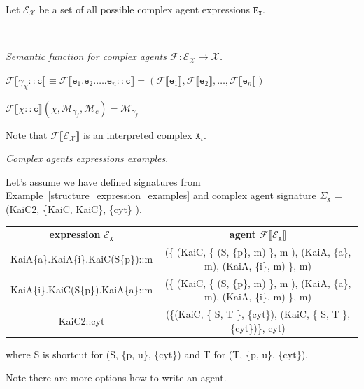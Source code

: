 \documentclass{elsarticle}
\begin{document}
\begin{definition}
Let $\mathcal{E}_\mathcal{X}$ be a set of all possible complex agent expressions $\mathtt{E}_\mathtt{X}$.
\end{definition}

\begin{definition}
~

\textit{Semantic function for complex agents $\mathcal{F}: \mathcal{E}_\mathcal{X} \rightarrow \mathcal{X}$.}

\begin{center}
$\mathcal{F} \llbracket \gamma_\chi::\mathtt{c} \rrbracket \equiv \mathcal{F} \llbracket \mathtt{e}_1.\mathtt{e}_2.\ldots.\mathtt{e}_n::\mathtt{c} \rrbracket  = (\mathcal{F} \llbracket \mathtt{e}_1 \rrbracket, \mathcal{F} \llbracket \mathtt{e}_2 \rrbracket, \ldots, \mathcal{F} \llbracket \mathtt{e}_n \rrbracket )$

$\mathcal{F} \llbracket \chi::\mathtt{c} \rrbracket (\chi, \mathcal{M}_{\gamma_f}, \mathcal{M}_c) = \mathcal{M}_{\gamma_f}$ 
\end{center}

\end{definition}

Note that $\mathcal{F} \llbracket \mathcal{E}_\mathcal{X} \rrbracket$ is an interpreted complex $\mathtt{X}_\iota$.


\begin{example}\label{complex_expression_examples}
\textit{Complex agents expressions examples}. 

Let's assume we have defined signatures from Example~\ref{structure_expression_examples} and complex agent signature $\Sigma_\mathtt{X}$ = (KaiC2, \{KaiC, KaiC\}, \{cyt\} ).

\begin{center}
\begin{tabular}{ c | c }
\textbf{expression} $\mathcal{E}_\mathtt{X}$ & \textbf{agent} $\mathcal{F} \llbracket \mathcal{E}_\mathtt{X} \rrbracket$ \\
KaiA\{a\}.KaiA\{i\}.KaiC(S\{p\})::m & (\{ (KaiC, \{ (S, \{p\}, m) \}, m ), (KaiA, \{a\}, m), (KaiA, \{i\}, m) \}, m) \\
KaiA\{i\}.KaiC(S\{p\}).KaiA\{a\}::m & (\{ (KaiC, \{ (S, \{p\}, m) \}, m ), (KaiA, \{a\}, m), (KaiA, \{i\}, m) \}, m) \\
KaiC2::cyt & (\{(KaiC, \{ S, T \}, \{cyt\}), (KaiC, \{ S, T \}, \{cyt\})\}, cyt) \\
\end{tabular}
\end{center}

where S is shortcut for (S, \{p, u\}, \{cyt\}) and T for (T, \{p, u\}, \{cyt\}).

Note there are more options how to write an agent.
\end{example}
\end{document}
